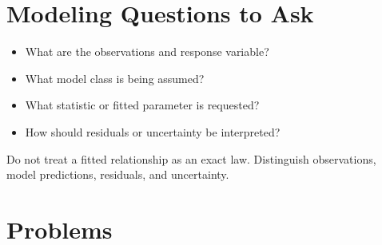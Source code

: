 \documentclass[11pt]{book}
\begin{document}
\section*{Modeling Questions to Ask}\begin{itemize}
\item What are the observations and response variable?
\item What model class is being assumed?
\item What statistic or fitted parameter is requested?
\item How should residuals or uncertainty be interpreted?
\end{itemize}
\begin{errorbox}Do not treat a fitted relationship as an exact law. Distinguish observations, model predictions, residuals, and uncertainty.\end{errorbox}
\section*{Problems}
\end{document}
